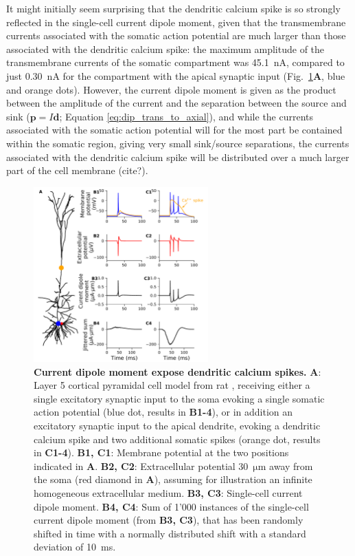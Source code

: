\documentclass[preprint,10pt,authoryear]{elsarticle}
\begin{document}
It might initially seem surprising that the dendritic calcium spike is so strongly reflected in the single-cell current dipole moment, given that the transmembrane currents associated with the somatic action potential are much larger than those associated with the dendritic calcium spike: the maximum amplitude of the transmembrane currents of the somatic compartment was 45.1~$\si{\nA}$, compared to just 0.30~$\si{\nA}$ for the compartment with the apical synaptic input (Fig.~\ref{fig:ca_spike}{\bf A}, blue and orange dots). However, the current dipole moment is given as the product between the amplitude of the current and the separation between the source and sink ($\mathbf{p}=I\mathbf{d}$; Equation \ref{eq:dip_trans_to_axial}), and while the currents associated with the somatic action potential will for the most part be contained within the somatic region, giving very small sink/source separations, the currents associated with the dendritic calcium spike will be distributed over a much larger part of the cell membrane (cite?).

\begin{figure}[H]
	\centering
	\includegraphics[width=0.6\textwidth]{ca_spike_hay}
	\caption{\textbf{Current dipole moment expose dendritic calcium spikes.}
	\textbf{A}: Layer 5 cortical pyramidal cell model from rat \citep{HAY2011}, receiving either a single excitatory synaptic input to the soma evoking a single somatic action potential (blue dot, results in \textbf{B1-4}), or in addition an excitatory synaptic input to the apical dendrite, evoking a dendritic calcium spike and two additional somatic spikes (orange dot, results in \textbf{C1-4}). 
	\textbf{B1, C1}: Membrane potential at the two positions indicated in \textbf{A}.
	\textbf{B2, C2}: Extracellular potential 30~$\si{\um}$ away from the soma (red diamond in \textbf{A}), assuming for illustration an infinite homogeneous extracellular medium. 
	\textbf{B3, C3}: Single-cell current dipole moment. 
	\textbf{B4, C4}: Sum of 1'000 instances of the single-cell current dipole moment (from \textbf{B3, C3}), that has been randomly shifted in time with a normally distributed shift with a standard deviation of 10~ms.
	}
	\label{fig:ca_spike}
\end{figure}
\end{document}

